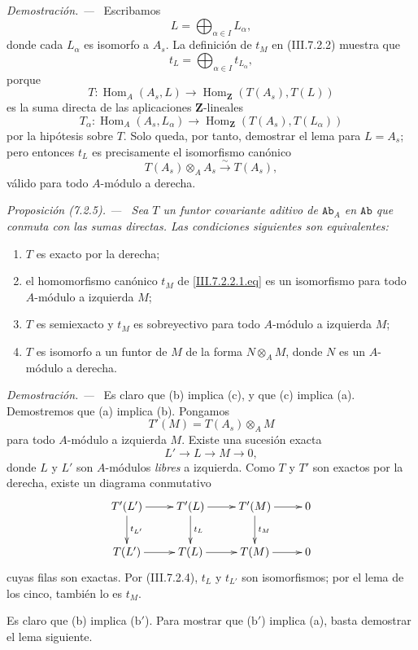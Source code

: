 \documentclass[10pt,oneside]{book}
\newcommand{\bb}[1]{\mathbf{#1}}
\newcommand{\cat}[1]{\mathtt{#1}}
\newcommand{\Hom}{\operatorname{Hom}}
\newcommand{\sref}[2][]{\textup{(#2)}}
\newcommand{\oldpage}[2][]{\setcounter{footnote}{0}\marginpar{\scriptsize\textbf{#1}~|~#2}\ignorespaces}
\newenvironment{proposition}[1][]{\par\medskip\noindent\itshape Proposición (#1). ---\ }{\par}
\newenvironment{proof}{\par\medskip\noindent\textit{Demostración. ---\ }}{\par}
\begin{document}
\begin{proof}
Escribamos
\[
  L=\bigoplus_{\alpha\in I}L_\alpha,
\]
donde cada $L_\alpha$ es isomorfo a $A_s$. La definición de $t_M$
en \sref{III.7.2.2} muestra que
\[
  t_L=\bigoplus_{\alpha\in I}t_{L_\alpha},
\]
porque
\[
  T:
  \Hom_A(A_s,L)
  \longrightarrow
  \Hom_{\bb Z}(T(A_s),T(L))
\]
es la suma directa de las aplicaciones $\bb Z$-lineales
\[
  T_\alpha:
  \Hom_A(A_s,L_\alpha)
  \longrightarrow
  \Hom_{\bb Z}(T(A_s),T(L_\alpha))
\]
por la hipótesis sobre $T$. Solo queda, por tanto, demostrar el
lema para $L=A_s$; pero entonces $t_L$ es precisamente el
isomorfismo canónico
\[
  T(A_s)\otimes_A A_s
  \xrightarrow{\sim}
  T(A_s),
\]
válido para todo $A$-módulo a derecha.
\end{proof}

\begin{proposition}[7.2.5]
\label{III.7.2.5}
Sea $T$ un funtor covariante aditivo de $\cat{Ab}_A$ en
$\cat{Ab}$ que conmuta con las sumas directas. Las condiciones
siguientes son equivalentes:
\begin{enumerate}
  \item[(a)] $T$ es exacto por la derecha;
  \item[(b)] el homomorfismo canónico $t_M$ de
    \eqref{III.7.2.2.1.eq} es un isomorfismo para todo $A$-módulo
    a izquierda $M$;
  \item[($\mathrm{b}'$)] $T$ es semiexacto y $t_M$ es
    sobreyectivo para todo $A$-módulo a izquierda $M$;
  \item[(c)] $T$ es isomorfo a un funtor de $M$ de la forma
    $N\otimes_A M$, donde $N$ es un $A$-módulo a derecha.
\end{enumerate}
\end{proposition}

\begin{proof}
Es claro que (b) implica (c), y que (c) implica (a). Demostremos
que (a) implica (b).
\oldpage[III]{179}
Pongamos
\[
  T'(M)=T(A_s)\otimes_A M
\]
para todo $A$-módulo a izquierda $M$. Existe una sucesión exacta
\[
  L'\longrightarrow L\longrightarrow M\longrightarrow0,
\]
donde $L$ y $L'$ son $A$-módulos \emph{libres} a izquierda. Como $T$ y
$T'$ son exactos por la derecha, existe un diagrama conmutativo
\[
\xymatrix{
  T'(L')\ar[r]\ar[d]^{t_{L'}}
  & T'(L)\ar[r]\ar[d]^{t_L}
  & T'(M)\ar[r]\ar[d]^{t_M}
  & 0
  \\
  T(L')\ar[r]
  & T(L)\ar[r]
  & T(M)\ar[r]
  & 0
}
\]
cuyas filas son exactas. Por \sref{III.7.2.4}, $t_L$ y
$t_{L'}$ son isomorfismos; por el lema de los cinco, también lo es
$t_M$.

Es claro que (b) implica ($\mathrm{b}'$). Para mostrar que
($\mathrm{b}'$) implica (a), basta demostrar el lema siguiente.
\end{proof}
\end{document}
